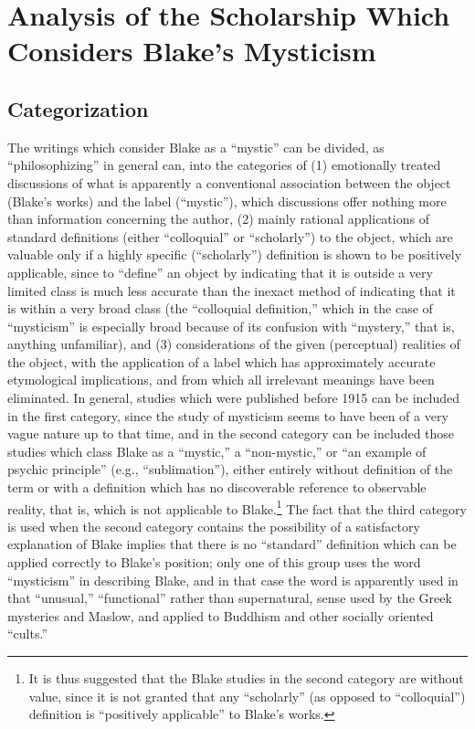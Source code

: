 \chapter[Analysis of the Scholarship Which Considers Blake's Mysticism]{Analysis of the Scholarship Which Considers Blake's Mysticism}

\section{Categorization}

The writings which consider Blake as a \enquote{mystic} can be
divided, as \enquote{philosophizing} in general can, into the categories of (1)
emotionally treated discussions of what is
apparently a conventional association between the object
(Blake's works) and the label (\enquote{mystic}), which discussions
offer nothing more than information concerning the author,
(2) mainly rational applications of standard definitions
(either \enquote{colloquial} or \enquote{scholarly}) to the object, which
are valuable only if a highly specific (\enquote{scholarly}) definition
is shown to be positively applicable, since to \enquote{define} an
object by indicating that it is outside a very limited
class is much less accurate than the inexact method of
indicating that it is within a very broad class (the
\enquote{colloquial definition,} which in the case of \enquote{mysticism} is
especially broad because of its confusion with \enquote{mystery,} that
is, anything unfamiliar), and (3) considerations of the
given (perceptual) realities of the object, with the application
of a label which has approximately accurate etymological
implications, and from which all irrelevant meanings have
been eliminated. In general, studies which were published
before 1915 can be included in the first category, since the
study of mysticism seems to have been of a very vague nature
up to that time, and in the second category can be included
those studies which class Blake as a \enquote{mystic,} a \enquote{non-mystic,}
or \enquote{an example of psychic principle} (e.g., \enquote{sublimation}),
either entirely without definition of the term or with a
definition which has no discoverable reference to observable
reality, that is, which is not applicable to Blake.\footnote{It is thus suggested that the Blake studies in the second category are without value, since it is not granted that any \enquote{scholarly} (as opposed to \enquote{colloquial}) definition is \enquote{positively applicable} to Blake's works.}
The fact that the third category is used when the second category
contains the possibility of a satisfactory explanation of Blake
implies that there is no \enquote{standard} definition which
can be applied correctly to Blake's position; only one of this
group uses the word \enquote{mysticism} in describing Blake, and in
that case the word is apparently used in that \enquote{unusual,}
\enquote{functional} rather than supernatural, sense used by the Greek
mysteries and Maslow, and applied to Buddhism and other
socially oriented \enquote{cults.}

